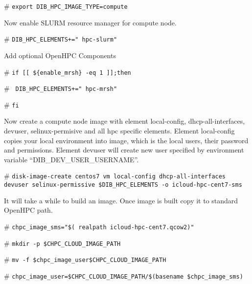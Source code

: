 \documentclass[12pt]{article}
\begin{document}
\begin{bash}[ctrlr]\# \texttt{\small{export DIB\_HPC\_IMAGE\_TYPE=compute}}\end{bash}

Now enable SLURM resource manager for compute node.

\begin{bash}[ctrlr]\# \texttt{\small{DIB\_HPC\_ELEMENTS+=" hpc-slurm"}}\end{bash}

Add optional OpenHPC Components

\begin{bash}[ctrlr]\# \texttt{\small{if [[ \$\{enable\_mrsh\} -eq 1 ]];then}}\end{bash}
\begin{bash}[ctrlr]\# \texttt{\small{       DIB\_HPC\_ELEMENTS+=" hpc-mrsh"}}\end{bash}
\begin{bash}[ctrlr]\# \texttt{\small{fi}}\end{bash}

Now create a compute node image with element local-config, dhcp-all-interfaces, devuser, selinux-permisive and all hpc specific elements. Element local-config copies your local environment into image, which is the local users, their password and permissions. Element devuser will create new user specified by environment variable “DIB\_DEV\_USER\_USERNAME”. 

\begin{bash}[ctrlr]\# \texttt{\small{disk-image-create centos7 vm local-config dhcp-all-interfaces devuser selinux-permissive \$DIB\_HPC\_ELEMENTS -o icloud-hpc-cent7-sms}}\end{bash}

It will take a while to build an image. Once image is built copy it to standard OpenHPC path.

\begin{bash}[ctrlr]\# \texttt{\small{chpc\_image\_sms="\$( realpath icloud-hpc-cent7.qcow2)"}}\end{bash}
\begin{bash}[ctrlr]\# \texttt{\small{mkdir -p \$CHPC\_CLOUD\_IMAGE\_PATH}}\end{bash}
\begin{bash}[ctrlr]\# \texttt{\small{mv -f \$chpc\_image\_user\$CHPC\_CLOUD\_IMAGE\_PATH}}\end{bash}
\begin{bash}[ctrlr]\# \texttt{\small{chpc\_image\_user=\$CHPC\_CLOUD\_IMAGE\_PATH/\$(basename \$chpc\_image\_sms)}}\end{bash}
\end{document}
